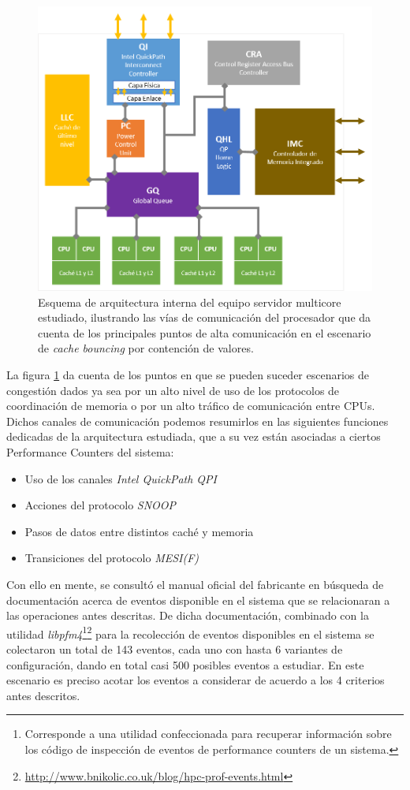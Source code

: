 \begin{figure}[!h]
	\centering
	\includegraphics[scale=.8]{imagenes/QuickPathChannels.png}
	\caption{Esquema de arquitectura interna del equipo servidor multicore estudiado, ilustrando las vías de comunicación del procesador que da cuenta de los principales puntos de alta comunicación en el escenario de \textit{cache bouncing} por contención de valores.}
	\label{fig:hwcomm}
\end{figure}

La figura \ref{fig:hwcomm} da cuenta de los puntos en que se pueden suceder escenarios de congestión dados ya sea por un alto nivel de uso de los protocolos de coordinación de memoria o por un alto tráfico de comunicación entre CPUs. Dichos canales de comunicación podemos resumirlos en las siguientes funciones dedicadas de la arquitectura estudiada, que a su vez están asociadas a ciertos Performance Counters del sistema:

\begin{itemize}
\item Uso de los canales \emph{Intel QuickPath QPI}
\item Acciones del protocolo \emph{SNOOP}
\item Pasos de datos entre distintos caché y memoria
\item Transiciones del protocolo \emph{MESI(F)}
\end{itemize}


Con ello en mente, se consultó el manual oficial del fabricante \cite{manual:bigbigevents} en búsqueda de documentación acerca de eventos disponible en el sistema que se relacionaran a las operaciones antes descritas. De dicha documentación, combinado con la utilidad \emph{libpfm4}\footnote{Corresponde a una utilidad confeccionada para recuperar información sobre los código de inspección de eventos de performance counters de un sistema.}\footnote{\url{http://www.bnikolic.co.uk/blog/hpc-prof-events.html}} para la recolección de eventos disponibles en el sistema se colectaron un total de 143 eventos, cada uno con hasta 6 variantes de configuración, dando en total casi 500 posibles eventos a estudiar. En este escenario es preciso acotar los eventos a considerar de acuerdo a los 4 criterios antes descritos.


